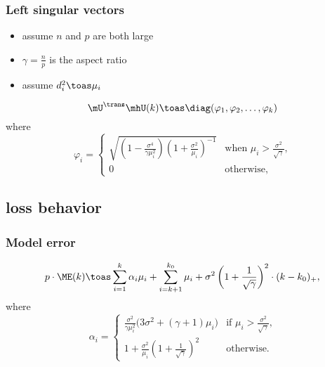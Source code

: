\documentclass[14pt]{beamer}
\begin{document}
\begin{frame} 
  \frametitle{Left singular vectors}
  \begin{itemize}
  \item assume $n$ and $p$ are both large
  \item $\gamma = \frac{n}{p}$ is the aspect ratio
  \item assume $d_i^2 \toas \mu_i$
  \end{itemize}
  \begin{theorem}
    \[
      \mU^\trans \mhU(k)
      \toas
      \diag(\varphi_1, \varphi_2, \ldots, \varphi_k)
    \]
    where
    \[
      \varphi_i =
        \begin{cases}
            \sqrt{
                \left( 1 - \frac{\sigma^4}{ \gamma \mu_i^2} \right)
                \left( 1 + \frac{\sigma^2}{ \mu_i  } \right)^{-1} }
            &\text{when $\mu_i > \frac{\sigma^2}{\sqrt{\gamma}}$,} \\
            0
            &\text{otherwise,}
        \end{cases}
    \]
  \end{theorem}
\end{frame}

\subsection{loss behavior}

\begin{frame}
  \frametitle{Model error}
  \begin{theorem}
\begin{equation*}
    p \cdot {\ME} (k)
        \toas
        \sum_{i=1}^{k}
            \alpha_i \mu_i
        +
        \sum_{i=k+1}^{k_0}
            \mu_i
        +
        \sigma^2
        \left(
            1 + \frac{1}{\sqrt{\gamma}}
        \right)^2
        \cdot
        (k - k_0)_+,
\end{equation*}
where
\begin{equation*}
    \alpha_i 
    =
    \begin{cases}
        \frac{\sigma^2}{\gamma \mu_i^2}
                \big(
                    3 \sigma^2 + (\gamma+1) \mu_i
                \big)
            &\text{if $\mu_i > \frac{\sigma^2}{\sqrt{\gamma}}$,} \\
        1 
        + 
        \frac{\sigma^2}{\mu_i}
        \left(
            1
            +
            \frac{1}{\sqrt{\gamma}}
        \right)^2
            &\text{otherwise.}
    \end{cases}
\end{equation*}
\end{theorem}
\end{frame}
\end{document}
